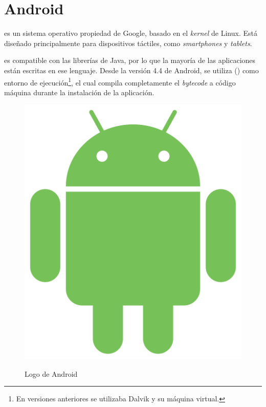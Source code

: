 
 \section{Android}

  es un sistema operativo propiedad de Google, basado en el \emph{kernel} de Linux.
 Está diseñado principalmente para dispositivos táctiles, como \emph{smartphones} y \emph{tablets}.

  es compatible con las librerías de Java, por lo que la mayoría de las aplicaciones están escritas en ese lenguaje.
 Desde la versión 4.4 de Android, se utiliza  () como entorno de ejecución\footnote{En versiones anteriores se utilizaba Dalvik y su máquina virtual.},
 el cual compila completamente el \emph{bytecode} a código máquina durante la instalación de la aplicación. \emph{\parencite{Reference7}}

 \begin{figure}[ht]
   \centering
   \includegraphics[scale=0.1]{Figures/AndroidLogo}
   \decoRule
   \caption[Android (Logo)]{Logo de Android} \emph{\parencite{Reference3}}
   \label{fig:AndroidLogo}
 \end{figure}

